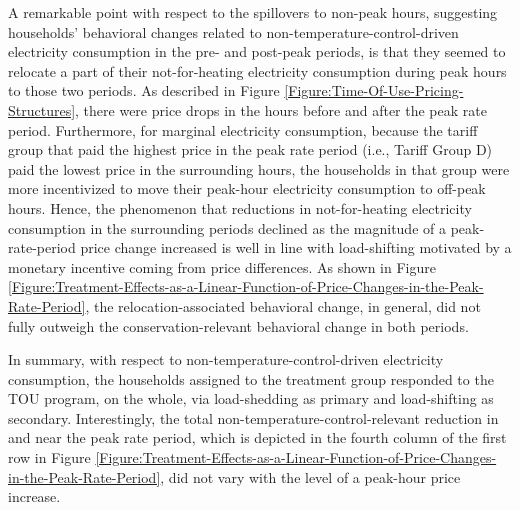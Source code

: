 A remarkable point with respect to the spillovers to non-peak hours, suggesting households' behavioral changes related to non-temperature-control-driven electricity consumption in the pre- and post-peak periods, is that they seemed to relocate a part of their not-for-heating electricity consumption during peak hours to those two periods. As described in Figure \ref{Figure:Time-Of-Use-Pricing-Structures}, there were price drops in the hours before and after the peak rate period. Furthermore, for marginal electricity consumption, because the tariff group that paid the highest price in the peak rate period (i.e., Tariff Group D) paid the lowest price in the surrounding hours, the households in that group were more incentivized to move their peak-hour electricity consumption to off-peak hours. Hence, the phenomenon that reductions in not-for-heating electricity consumption in the surrounding periods declined as the magnitude of a peak-rate-period price change increased is well in line with load-shifting motivated by a monetary incentive coming from price differences. As shown in Figure \ref{Figure:Treatment-Effects-as-a-Linear-Function-of-Price-Changes-in-the-Peak-Rate-Period}, the relocation-associated behavioral change, in general, did not fully outweigh the conservation-relevant behavioral change in both periods. 

In summary, with respect to non-temperature-control-driven electricity consumption, the households assigned to the treatment group responded to the TOU program, on the whole, via load-shedding as primary and load-shifting as secondary. Interestingly, the total non-temperature-control-relevant reduction in and near the peak rate period, which is depicted in the fourth column of the first row in Figure \ref{Figure:Treatment-Effects-as-a-Linear-Function-of-Price-Changes-in-the-Peak-Rate-Period}, did not vary with the level of a peak-hour price increase. 

